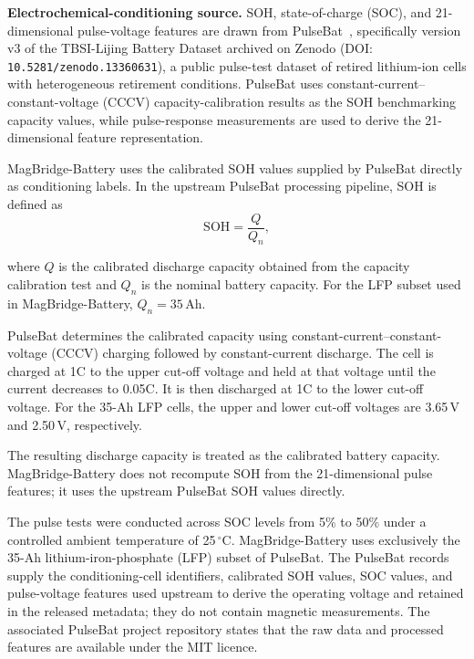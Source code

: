 \documentclass[11pt]{article}
\begin{document}
\noindent\textbf{Electrochemical-conditioning source.}
SOH, state-of-charge (SOC), and 21-dimensional pulse-voltage features are
drawn from PulseBat~\cite{tao2024pulsebat,tao2024pulsebatdata},
specifically version v3 of the TBSI-Lijing Battery Dataset archived on Zenodo
(DOI: \texttt{10.5281/\allowbreak zenodo.13360631}), a public pulse-test
dataset of retired lithium-ion cells with heterogeneous retirement conditions.
PulseBat uses constant-current--constant-voltage (CCCV) capacity-calibration
results as the SOH benchmarking capacity values, while pulse-response
measurements are used to derive the 21-dimensional feature representation.

MagBridge-Battery uses the calibrated SOH values supplied by PulseBat
directly as conditioning labels. In the upstream PulseBat processing
pipeline, SOH is defined as
\begin{equation}
\mathrm{SOH}=\frac{Q}{Q_n},
\end{equation}


where $Q$ is the calibrated discharge capacity obtained
from the capacity calibration test and $Q_n$ is the
nominal battery capacity. For the LFP subset used in
MagBridge-Battery, $Q_n=35$\,Ah.

PulseBat determines the calibrated capacity using
constant-current--constant-voltage (CCCV) charging
followed by constant-current discharge. The cell is
charged at 1C to the upper cut-off voltage and held
at that voltage until the current decreases to 0.05C.
It is then discharged at 1C to the lower cut-off
voltage. For the 35-Ah LFP cells, the upper and lower
cut-off voltages are 3.65\,V and 2.50\,V, respectively.

The resulting discharge capacity is treated as the
calibrated battery capacity. MagBridge-Battery does
not recompute SOH from the 21-dimensional pulse
features; it uses the upstream PulseBat SOH values
directly.

The pulse tests were conducted across SOC levels from 5\% to 50\% under a controlled ambient temperature of 25\,$^\circ$C. MagBridge-Battery uses exclusively the 35-Ah
lithium-iron-phosphate (LFP) subset of PulseBat. The PulseBat records supply the conditioning-cell identifiers, calibrated SOH values, SOC values, and pulse-voltage features used upstream to derive the operating voltage and retained in the released metadata; they do not contain magnetic measurements. The associated PulseBat project repository states that the raw data and processed features are available under the MIT licence.
\end{document}

